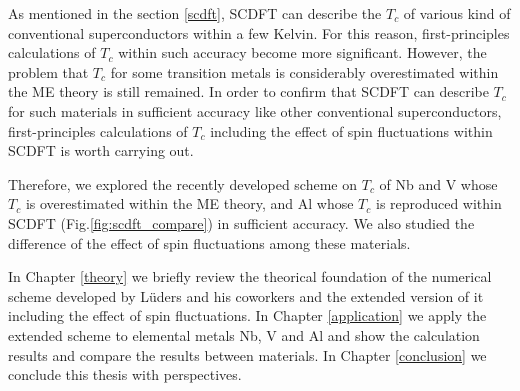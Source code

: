 As mentioned in the section \ref{scdft}, SCDFT can describe the $T_c$ of various kind of conventional
superconductors within a few Kelvin. 
For this reason, first-principles calculations of $T_c$ within such accuracy become more significant.
However, the problem that $T_c$ for some transition metals is 
considerably overestimated within the ME theory is still remained. In order to confirm that SCDFT
can describe $T_c$ for such materials in sufficient accuracy like other conventional superconductors,
first-principles calculations of $T_c$ including the effect of spin fluctuations within SCDFT is 
worth carrying out.

Therefore, we explored the recently developed scheme\cite{Essenberger2014} on $T_c$ of Nb and V 
whose $T_c$ is overestimated within the ME theory, and Al whose $T_c$ is reproduced within 
SCDFT (Fig.\ref{fig:scdft_compare}) in sufficient accuracy. We also studied the difference of the 
effect of spin fluctuations among these materials.

In Chapter \ref{theory} we briefly review the theorical foundation of the numerical scheme 
developed by L\"{u}ders and his coworkers\cite{Luders2005} and the extended version of it 
including the effect of spin fluctuations\cite{Essenberger2014}.
In Chapter \ref{application} we apply the extended scheme to elemental metals Nb, V and Al and show 
the calculation results and compare the results between materials.
In Chapter \ref{conclusion} we conclude this thesis with perspectives.


